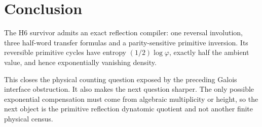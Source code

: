 \section{Conclusion}

The H6 survivor admits an exact reflection compiler: one reversal involution,
three half-word transfer formulas and a parity-sensitive primitive inversion.
Its reversible primitive cycles have entropy $(1/2)\log\varphi$, exactly half
the ambient value, and hence exponentially vanishing density.

This closes the physical counting question exposed by the preceding Galois
interface obstruction.  It also makes the next question sharper.  The only
possible exponential compensation must come from algebraic multiplicity or
height, so the next object is the primitive reflection dynatomic quotient and
not another finite physical census.
